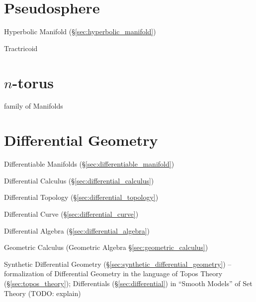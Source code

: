 \section{Pseudosphere}\label{sec:pseudosphere}

Hyperbolic Manifold (\S\ref{sec:hyperbolic_manifold})

Tractricoid



\section{$n$-torus}\label{sec:n_torus}

family of Manifolds



\section{Differential Geometry}\label{sec:differential_geometry}

Differentiable Manifolds (\S\ref{sec:differentiable_manifold})

\fist Differential Calculus (\S\ref{sec:differential_calculus})

\fist Differential Topology (\S\ref{sec:differential_topology})

\fist Differential Curve (\S\ref{sec:differential_curve})

\fist Differential Algebra (\S\ref{sec:differential_algebra})

\fist Geometric Calculus (Geometric Algebra \S\ref{sec:geometric_calculus})

\fist Synthetic Differential Geometry
(\S\ref{sec:synthetic_differential_geometry}) -- formalization of Differential
Geometry in the language of Topos Theory (\S\ref{sec:topos_theory});
Differentials (\S\ref{sec:differential}) in ``Smooth Models'' of Set Theory
(TODO: explain)



